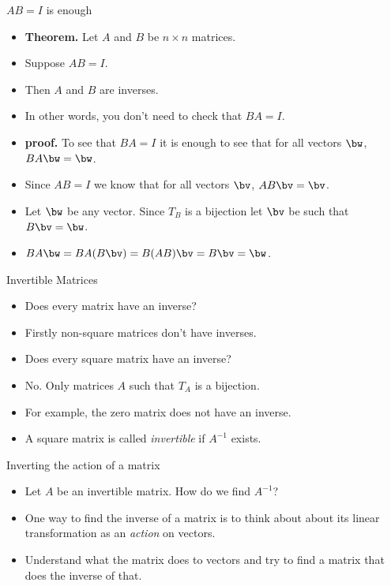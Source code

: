\documentclass{beamer}
\begin{document}
\begin{frame}{$AB=I$ is enough}

\begin{itemize}
\item \textbf{Theorem.} Let $A$  and $B$ be $n\times n$ matrices.
\item Suppose $AB=I$.
\item Then $A$ and $B$ are inverses.
\item In other words, you don't need to check that $BA=I$.
\item \textbf{proof.} To see that $BA=I$ it is enough to see that for all
vectors $\bw$, $BA\bw=\bw$.
\item Since $AB=I$ we know that for all vectors $\bv$, $AB\bv=\bv$.
\item Let $\bw$ be any vector. Since $T_B$ is a bijection let $\bv$ be such
that $B\bv=\bw$.
\item $BA\bw=BA(B\bv) = B (AB)\bv = B\bv = \bw$.
\end{itemize}
\end{frame}
\begin{frame}{Invertible Matrices}

\begin{itemize}
\item Does every matrix have an inverse?
\item Firstly non-square matrices don't have inverses.
\item Does every square matrix have an inverse?
\item No. Only matrices $A$ such that $T_A$ is a bijection.
\item For example, the zero matrix does not have an inverse.
\item A square matrix is called \emph{invertible} if $A^{-1}$ exists.
\end{itemize}
\end{frame}

\begin{frame}{Inverting the action of a matrix}

\begin{itemize}
\item Let $A$ be an invertible matrix. How do we find $A^{-1}$?
\item One way to find the inverse of a matrix is to think about
about its linear transformation as an \emph{action} on vectors.
\item Understand what the matrix does to vectors and try to find
a matrix that does the inverse of that.
\end{itemize}
\end{frame}
\end{document}
